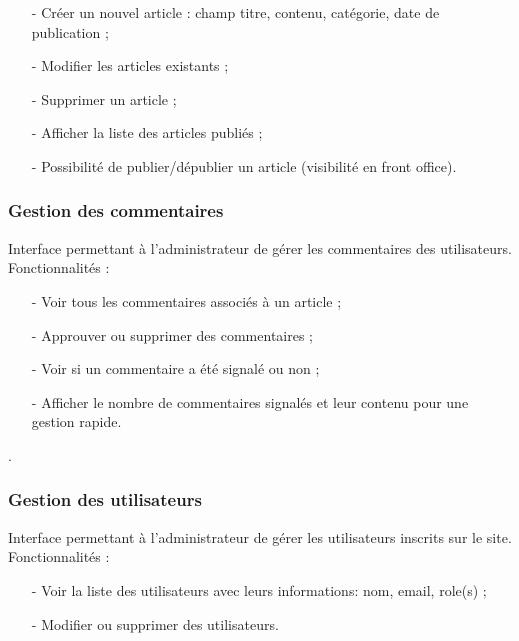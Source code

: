 \documentclass[12pt,a4paper]{article}
\begin{document}
    \begin{itemize}
    		\item[-] Créer un nouvel article : champ titre, contenu, catégorie, date de publication ;
    		\item[-] Modifier les articles existants ;
    		\item[-] Supprimer un article ;
    		\item[-] Afficher la liste des articles publiés ;
    		\item[-] Possibilité de publier/dépublier un article (visibilité en front office).
    \end{itemize}
        
       
\subsubsection{Gestion des commentaires}

   	Interface permettant à l’administrateur de gérer les commentaires des utilisateurs.\\
   
    Fonctionnalités :
    \\
    \begin{itemize}
    		\item[-] Voir tous les commentaires associés à un article ;
    		\item[-] Approuver ou supprimer des commentaires ;
    		\item[-] Voir si un commentaire a été signalé ou non ;
    		\item[-] Afficher le nombre de commentaires signalés et leur contenu pour une gestion rapide.
    \end{itemize}
        .       

\subsubsection{Gestion des utilisateurs}

    Interface permettant à l’administrateur de gérer les utilisateurs inscrits sur le site.\\
    
    Fonctionnalités :
    
    \begin{itemize}
    		\item[-] Voir la liste des utilisateurs avec leurs informations: nom, email, role(s) ;
    		\item[-] Modifier ou supprimer des utilisateurs.
    \end{itemize}
\end{document}
